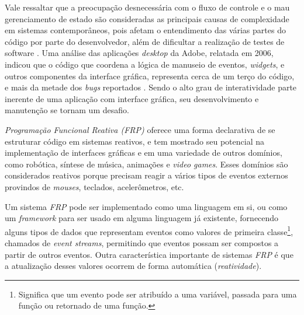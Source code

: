 Vale ressaltar que a preocupação desnecessária com o
fluxo de controle e o mau gerenciamento de estado são
consideradas as principais causas de complexidade em
sistemas contemporâneos, pois afetam o entendimento das
várias partes do código por parte do desenvolvedor,
além de dificultar a realização de testes de software
\cite{Moseley06outof}.
Uma análise das aplicações \textit{desktop} da Adobe,
relatada em 2006, indicou que o código que coordena a
lógica de manuseio de eventos, \textit{widgets}, e outros
componentes da interface gráfica, representa cerca de
um terço do código, e mais da metade dos \textit{bugs}
reportados \cite{jarvi2008property}.
Sendo o alto grau de interatividade parte inerente de uma
aplicação com interface gráfica, seu desenvolvimento e
manutenção se tornam um desafio.


%

\emph{Programação Funcional Reativa (FRP)} oferece uma forma
declarativa de se estruturar código em sistemas reativos,
e tem mostrado seu potencial na implementação de
interfaces gráficas e em uma variedade de outros domínios,
como robótica, síntese de música, animações e
\textit{video games}. Esses domínios são considerados
reativos porque precisam reagir a vários tipos de
eventos externos provindos de \textit{mouses}, teclados,
acelerômetros, etc.

Um sistema \textit{FRP} pode ser implementado como uma
linguagem em si, ou como um \textit{framework} para ser
usado em alguma linguagem já existente, fornecendo alguns
tipos de dados que representam eventos como valores de
primeira classe\footnote{
  Significa que um evento pode ser atribuído a uma
  variável, passada para uma função ou retornado de
  uma função.
},
chamados de \textit{event streams}, permitindo que eventos
possam ser compostos a partir de outros eventos.
Outra característica importante de sistemas \textit{FRP}
é que a atualização desses valores ocorrem de forma
automática (\textit{reatividade}).

